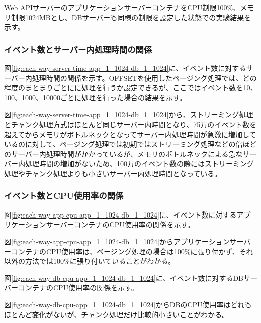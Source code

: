 \documentclass[../../../../main]{subfiles}
\begin{document}
    Web APIサーバーのアプリケーションサーバーコンテナをCPU制限100\%、メモリ制限1024MBとし、DBサーバーも同様の制限を設定した状態での実験結果を示す。

    \subsubsection{イベント数とサーバー内処理時間の関係}\label{subsubsubsec:result-each-way-only-limit-server-time}

    図\ref{fig:each-way-server-time-app_1_1024-db_1_1024}に、イベント数に対するサーバー内処理時間の関係を示す。OFFSETを使用したページング処理では、どの程度のまとまりごとにに処理を行うか設定できるが、ここではイベント数を10、100、1000、10000ごとに処理を行った場合の結果を示す。

    

    図\ref{fig:each-way-server-time-app_1_1024-db_1_1024}から、ストリーミング処理とチャンク処理方式はほとんど同じサーバー内時間となり、75万のイベント数を超えてからメモリがボトルネックとなってサーバー内処理時間が急激に増加しているのに対して、ページング処理では初期ではストリーミング処理などの倍ほどのサーバー内処理時間がかかっているが、メモリのボトルネックによる急なサーバー内処理時間の増加がないため、100万のイベント数の際にはストリーミング処理やチャンク処理よりも小さいサーバー内処理時間となっている。

    \subsubsection{イベント数とCPU使用率の関係}\label{subsubsubsec:result-each-way-only-limit-cpu}

    図\ref{fig:each-way-app-cpu-app_1_1024-db_1_1024}に、イベント数に対するアプリケーションサーバーコンテナのCPU使用率の関係を示す。

    

    図\ref{fig:each-way-app-cpu-app_1_1024-db_1_1024}からアプリケーションサーバーコンテナのCPU使用率は、ページング処理の場合は100\%に張り付かず、それ以外の方法では100\%に張り付いていることがわかる。

    図\ref{fig:each-way-db-cpu-app_1_1024-db_1_1024}に、イベント数に対するDBサーバーコンテナのCPU使用率の関係を示す。

    

    図\ref{fig:each-way-db-cpu-app_1_1024-db_1_1024}からDBのCPU使用率はどれもほとんど変化がないが、チャンク処理だけ比較的小さいことがわかる。
\end{document}
